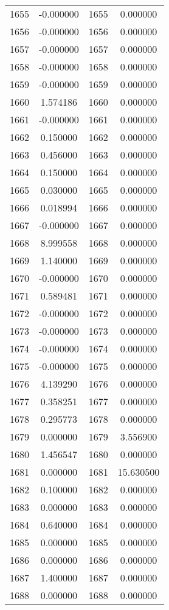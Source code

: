 \documentclass[12pt]{article}
\begin{document}
\begin{longtable}{@{}cccc@{}}
1655 & -0.000000 & 1655 & 0.000000 \\
1656 & -0.000000 & 1656 & 0.000000 \\
1657 & -0.000000 & 1657 & 0.000000 \\
1658 & -0.000000 & 1658 & 0.000000 \\
1659 & -0.000000 & 1659 & 0.000000 \\
1660 & 1.574186 & 1660 & 0.000000 \\
1661 & -0.000000 & 1661 & 0.000000 \\
1662 & 0.150000 & 1662 & 0.000000 \\
1663 & 0.456000 & 1663 & 0.000000 \\
1664 & 0.150000 & 1664 & 0.000000 \\
1665 & 0.030000 & 1665 & 0.000000 \\
1666 & 0.018994 & 1666 & 0.000000 \\
1667 & -0.000000 & 1667 & 0.000000 \\
1668 & 8.999558 & 1668 & 0.000000 \\
1669 & 1.140000 & 1669 & 0.000000 \\
1670 & -0.000000 & 1670 & 0.000000 \\
1671 & 0.589481 & 1671 & 0.000000 \\
1672 & -0.000000 & 1672 & 0.000000 \\
1673 & -0.000000 & 1673 & 0.000000 \\
1674 & -0.000000 & 1674 & 0.000000 \\
1675 & -0.000000 & 1675 & 0.000000 \\
1676 & 4.139290 & 1676 & 0.000000 \\
1677 & 0.358251 & 1677 & 0.000000 \\
1678 & 0.295773 & 1678 & 0.000000 \\
1679 & 0.000000 & 1679 & 3.556900 \\
1680 & 1.456547 & 1680 & 0.000000 \\
1681 & 0.000000 & 1681 & 15.630500 \\
1682 & 0.100000 & 1682 & 0.000000 \\
1683 & 0.000000 & 1683 & 0.000000 \\
1684 & 0.640000 & 1684 & 0.000000 \\
1685 & 0.000000 & 1685 & 0.000000 \\
1686 & 0.000000 & 1686 & 0.000000 \\
1687 & 1.400000 & 1687 & 0.000000 \\
1688 & 0.000000 & 1688 & 0.000000 \\

\end{longtable}
\end{document}
